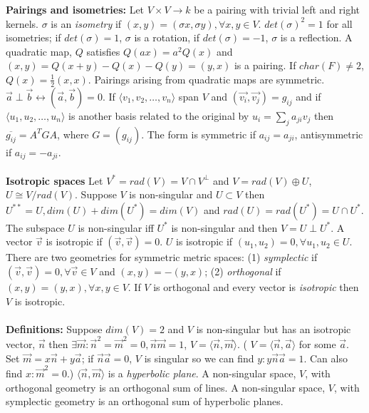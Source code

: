 {\bf Pairings and isometries:}  Let $V \times V \rightarrow k$ be a pairing with trivial
left and right kernels.   $\sigma$ is an \emph{isometry} if 
$(x,y)=(\sigma x, \sigma y), \forall x,y \in V$.  $det(\sigma)^2=1$ for all isometries;
if $det(\sigma)= 1$, $\sigma$ is a rotation,
if $det(\sigma)= -1$, $\sigma$ is a reflection.  A quadratic map, $Q$ satisfies
$Q(ax)=a^2 Q(x)$ and $(x,y)= Q(x+y)-Q(x)-Q(y)=(y,x)$ is a pairing.  If $char(F) \ne 2$,
$Q(x)= {\frac 1 2}  (x,x)$.  Pairings arising from quadratic maps are symmetric.
${\vec a} \perp {\vec b} \leftrightarrow ({\vec a}, {\vec b})=0$.  
If $\langle v_1 , v_2 , \ldots , v_n \rangle$ span $V$ and 
$({\vec {v_i}}, {\vec {v_j}})= g_{ij}$ and
if $\langle u_1 , u_2 , \ldots , u_n \rangle$ is another basis related to the original by
$u_i = \sum_j a_{ji} v_j$ then ${\overline {g_{ij}}} =A^T G A$, where $G=(g_{ij})$.
The form is symmetric if $a_{ij}= a_{ji}$, antisymmetric if $a_{ij}= - a_{ji}$.
\\
\\
{\bf Isotropic spaces}
Let $V^* = rad(V)= V \cap V^{\perp}$ and
$V= rad(V) \oplus U$, $U \cong V/rad(V)$.
Suppose $V$ is non-singular and $U \subset V$ then $U^{**}=U, dim(U) + dim(U^*) = dim(V)$ and
$rad(U) =rad(U^*)= U \cap U^*$.  The subspace $U$ is non-singular iff $U^*$ is non-singular
and then $V= U \perp U^*$.  A vector ${\vec v}$
is isotropic if $({\vec v}, {\vec v})=0$.  
$U$ is isotropic if $(u_1 , u_2)= 0, \forall u_1, u_2 \in U$.
There are two geometries for symmetric metric
spaces: (1) \emph{symplectic} if $({\vec v}, {\vec v}) = 0, \forall {\vec v} \in V$ and
$(x,y)= -(y,x)$; (2) \emph{orthogonal} if $(x,y)=(y,x), \forall x,y \in V$.
If $V$ is orthogonal and every vector is \emph{isotropic} then $V$ is isotropic.
\\
\\
{\bf Definitions:}
Suppose $dim(V)=2$ and $V$ is non-singular but has an isotropic vector, ${\vec n}$ then
$\exists {\vec m}: {\vec n}^2={\vec m}^2=0, {\vec n}{\vec m}=1$, 
$V= \langle {\vec n}, {\vec m} \rangle$. (
$V= \langle {\vec n} , {\vec a} \rangle$ for some 
${\vec a}$. Set ${\vec m}= x {\vec n} + y{\vec a}$; if
${\vec n} {\vec a}=0$, $V$ is singular so we can find $y: y{\vec n} {\vec a} = 1$.  
Can also
find $x: {\vec m}^2=0$.)  $\langle {\vec n}, {\vec m} \rangle$ is a 
\emph{hyperbolic plane}.
A non-singular space, $V$, with orthogonal geometry is an orthogonal sum of lines.
A non-singular space, $V$, with symplectic geometry is an orthogonal sum of 
hyperbolic planes.
\\
\\
